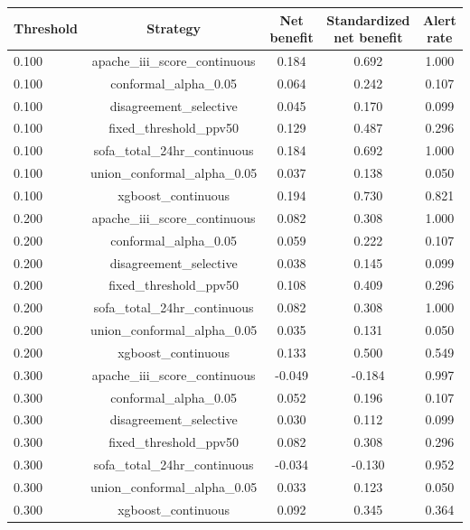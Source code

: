 \begin{tabular}{@{}lcccc@{}}
\toprule
Threshold & Strategy & Net benefit & Standardized net benefit & Alert rate\\
\midrule
0.100 & apache\_iii\_score\_continuous & 0.184 & 0.692 & 1.000\\
0.100 & conformal\_alpha\_0.05 & 0.064 & 0.242 & 0.107\\
0.100 & disagreement\_selective & 0.045 & 0.170 & 0.099\\
0.100 & fixed\_threshold\_ppv50 & 0.129 & 0.487 & 0.296\\
0.100 & sofa\_total\_24hr\_continuous & 0.184 & 0.692 & 1.000\\
0.100 & union\_conformal\_alpha\_0.05 & 0.037 & 0.138 & 0.050\\
0.100 & xgboost\_continuous & 0.194 & 0.730 & 0.821\\
0.200 & apache\_iii\_score\_continuous & 0.082 & 0.308 & 1.000\\
0.200 & conformal\_alpha\_0.05 & 0.059 & 0.222 & 0.107\\
0.200 & disagreement\_selective & 0.038 & 0.145 & 0.099\\
0.200 & fixed\_threshold\_ppv50 & 0.108 & 0.409 & 0.296\\
0.200 & sofa\_total\_24hr\_continuous & 0.082 & 0.308 & 1.000\\
0.200 & union\_conformal\_alpha\_0.05 & 0.035 & 0.131 & 0.050\\
0.200 & xgboost\_continuous & 0.133 & 0.500 & 0.549\\
0.300 & apache\_iii\_score\_continuous & -0.049 & -0.184 & 0.997\\
0.300 & conformal\_alpha\_0.05 & 0.052 & 0.196 & 0.107\\
0.300 & disagreement\_selective & 0.030 & 0.112 & 0.099\\
0.300 & fixed\_threshold\_ppv50 & 0.082 & 0.308 & 0.296\\
0.300 & sofa\_total\_24hr\_continuous & -0.034 & -0.130 & 0.952\\
0.300 & union\_conformal\_alpha\_0.05 & 0.033 & 0.123 & 0.050\\
0.300 & xgboost\_continuous & 0.092 & 0.345 & 0.364\\
\bottomrule
\end{tabular}
